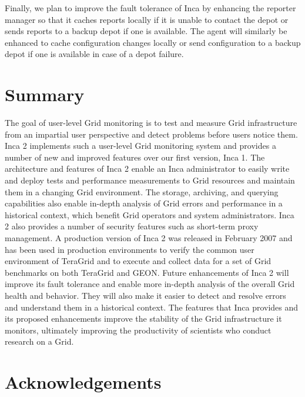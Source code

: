 \documentclass{sig-alternate}
\begin{document}
Finally, we plan to improve the fault tolerance of Inca by enhancing the
reporter manager so that it caches reports locally if it is unable to
contact the depot or sends reports to a backup depot if one is available.
The agent will similarly be enhanced to cache configuration changes locally or
send configuration to a backup depot if one is available in case of a depot
failure.

\section{Summary}

The goal of user-level Grid monitoring is to test and measure Grid
infrastructure from an impartial user perspective and detect problems before
users notice them.  Inca 2 implements such a user-level Grid monitoring system
and provides a number of new and improved features over our first version,
Inca 1.  The architecture and features of Inca 2 enable an Inca administrator
to easily write and deploy tests and performance measurements to Grid
resources and maintain them in a changing Grid environment.  The storage,
archiving, and querying capabilities also enable in-depth analysis of Grid
errors and performance in a historical context, which benefit Grid
operators and system administrators.  Inca 2 also provides a number of
security features such as short-term proxy management.
A production version of Inca 2 was released in February 2007 and
has been used in production environments to verify the common user environment
of TeraGrid and to execute and collect data for a set of Grid benchmarks on
both TeraGrid and GEON.  Future enhancements of Inca 2 will improve its fault
tolerance and enable more in-depth analysis of the overall Grid health and
behavior.  They will also make it easier to detect and resolve errors
and understand them in a historical context.  The features that Inca
provides and its proposed enhancements improve the stability of the
Grid infrastructure it monitors, ultimately improving the productivity of
scientists who conduct research on a Grid. 

\section{Acknowledgements}
\end{document}
